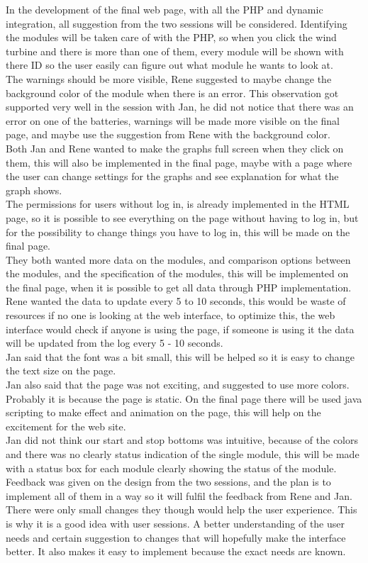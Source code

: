 In the development of the final web page, with all the PHP and dynamic integration, all suggestion from the two sessions will be considered. Identifying the modules will be taken care of with the PHP, so when you click the wind turbine and there is more than one of them, every module will be shown with there ID so the user easily can figure out what module he wants to look at.\\
The warnings should be more visible, Rene suggested to maybe change the background color of the module when there is an error. This observation got supported very well in the session with Jan, he did not notice that there was an error on one of the batteries, warnings will be made more visible on the final page, and maybe use the suggestion from Rene with the background color.\\
Both Jan and Rene wanted to make the graphs full screen when they click on them, this will also be implemented in the final page, maybe with a page where the user can change settings for the graphs and see explanation for what the graph shows.\\
The permissions for users without log in, is already implemented in the HTML page, so it is possible to see everything on the page without having to log in, but for the possibility to change things you have to log in, this will be made on the final page.\\
They both wanted more data on the modules, and comparison options between the modules, and the specification of the modules, this will be implemented on the final page, when it is possible to get all data through PHP implementation.\\
Rene wanted the data to update every 5 to 10 seconds, this would be waste of resources if no one is looking at the web interface, to optimize this, the web interface would check if anyone is using the page, if someone is using it the data will be updated from the log every 5 - 10 seconds.\\
Jan said that the font was a bit small, this will be helped so it is easy to change the text size on the page.\\
Jan also said that the page was not exciting, and suggested to use more colors. Probably it is because the page is static. On the final page there will be used java scripting to make effect and animation on the page, this will help on the excitement for the web site.\\
Jan did not think our start and stop bottoms was intuitive, because of the colors and there was no clearly status indication of the single module, this will be made with a status box for each module clearly showing the status of the module.\\
Feedback was given on the design from the two sessions, and the plan is to implement all of them in a way so it will fulfil the feedback from Rene and Jan. There were only small changes they though would help the user experience. This is why it is a good idea with user sessions. A better understanding of the user needs and certain suggestion to changes that will hopefully make the interface better. It also makes it easy to implement because the exact needs are known.

